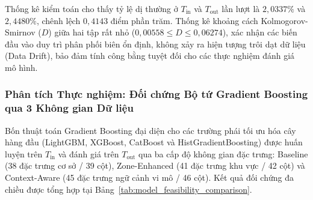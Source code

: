 Thống kê kiểm toán cho thấy tỷ lệ dị thường ở $T_{\text{in}}$ và $T_{\text{out}}$ lần lượt là $2{,}0337\%$ và $2{,}4480\%$, chênh lệch $0{,}4143$ điểm phần trăm. Thống kê khoảng cách Kolmogorov-Smirnov ($D$) giữa hai tập rất nhỏ ($0{,}00558 \le D \le 0{,}06274$), xác nhận các biến đầu vào duy trì phân phối biên ổn định, không xảy ra hiện tượng trôi dạt dữ liệu (Data Drift), bảo đảm tính công bằng tuyệt đối cho các thực nghiệm đánh giá mô hình.

\subsubsection{Phân tích Thực nghiệm: Đối chứng Bộ tứ Gradient Boosting qua 3 Không gian Dữ liệu}

Bốn thuật toán Gradient Boosting đại diện cho các trường phái tối ưu hóa cây hàng đầu (LightGBM, XGBoost, CatBoost và HistGradientBoosting) được huấn luyện trên $T_{\text{in}}$ và đánh giá trên $T_{\text{out}}$ qua ba cấp độ không gian đặc trưng: Baseline (38 đặc trưng cơ sở / 39 cột), Zone-Enhanced (41 đặc trưng khu vực / 42 cột) và Context-Aware (45 đặc trưng ngữ cảnh vi mô / 46 cột). Kết quả đối chứng đa chiều được tổng hợp tại Bảng~\ref{tab:model_feasibility_comparison}.

